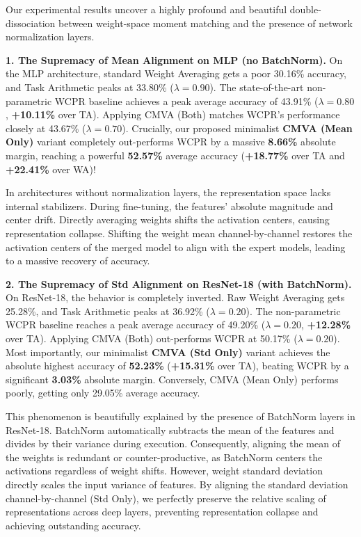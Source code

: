 \documentclass{article}
\theoremstyle{plain}
\theoremstyle{definition}
\theoremstyle{remark}
\begin{document}
Our experimental results uncover a highly profound and beautiful double-dissociation between weight-space moment matching and the presence of network normalization layers.

\textbf{1. The Supremacy of Mean Alignment on MLP (no BatchNorm).}
On the MLP architecture, standard Weight Averaging gets a poor 30.16\% accuracy, and Task Arithmetic peaks at 33.80\% ($\lambda = 0.90$). The state-of-the-art non-parametric WCPR baseline \citep{submission9} achieves a peak average accuracy of 43.91\% ($\lambda = 0.80$, \textbf{+10.11\%} over TA). Applying CMVA (Both) matches WCPR's performance closely at 43.67\% ($\lambda = 0.70$). Crucially, our proposed minimalist \textbf{CMVA (Mean Only)} variant completely out-performs WCPR by a massive \textbf{8.66\%} absolute margin, reaching a powerful \textbf{52.57\%} average accuracy (\textbf{+18.77\%} over TA and \textbf{+22.41\%} over WA)!

In architectures without normalization layers, the representation space lacks internal stabilizers. During fine-tuning, the features' absolute magnitude and center drift. Directly averaging weights shifts the activation centers, causing representation collapse. Shifting the weight mean channel-by-channel restores the activation centers of the merged model to align with the expert models, leading to a massive recovery of accuracy.

\textbf{2. The Supremacy of Std Alignment on ResNet-18 (with BatchNorm).}
On ResNet-18, the behavior is completely inverted. Raw Weight Averaging gets 25.28\%, and Task Arithmetic peaks at 36.92\% ($\lambda = 0.20$). The non-parametric WCPR baseline reaches a peak average accuracy of 49.20\% ($\lambda = 0.20$, \textbf{+12.28\%} over TA). Applying CMVA (Both) out-performs WCPR at 50.17\% ($\lambda = 0.20$). Most importantly, our minimalist \textbf{CMVA (Std Only)} variant achieves the absolute highest accuracy of \textbf{52.23\%} (\textbf{+15.31\%} over TA), beating WCPR by a significant \textbf{3.03\%} absolute margin. Conversely, CMVA (Mean Only) performs poorly, getting only 29.05\% average accuracy.

This phenomenon is beautifully explained by the presence of BatchNorm layers in ResNet-18. BatchNorm automatically subtracts the mean of the features and divides by their variance during execution. Consequently, aligning the mean of the weights is redundant or counter-productive, as BatchNorm centers the activations regardless of weight shifts. However, weight standard deviation directly scales the input variance of features. By aligning the standard deviation channel-by-channel (Std Only), we perfectly preserve the relative scaling of representations across deep layers, preventing representation collapse and achieving outstanding accuracy.
\end{document}
